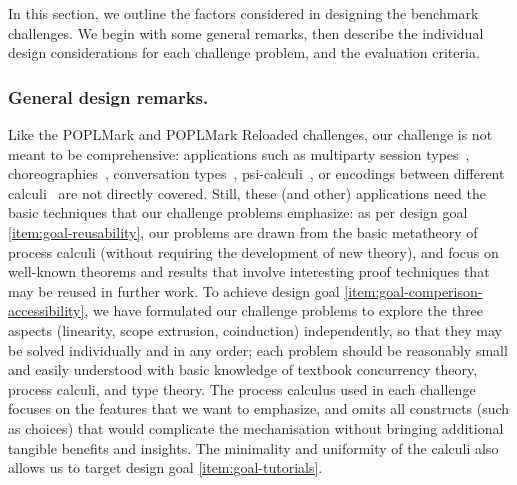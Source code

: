 \documentclass[runningheads]{llncs}
\begin{document}
In this section, we outline the factors considered in designing the
benchmark challenges. We begin with some general remarks, then
describe the individual design considerations for each challenge problem,
and the evaluation criteria.

\subsubsection{General design remarks.}
Like the POPLMark and POPLMark Reloaded challenges, our challenge is not meant to be comprehensive:
applications such as multiparty session types~\cite{10.1145/2827695,10.1145/3290343}, choreographies~\cite{DBLP:journals/jar/CruzFilipeMP23}, conversation types~\cite{DBLP:journals/tcs/CairesV10}, psi-calculi~\cite{lmcs:696}, or encodings between different calculi~\cite{DBLP:journals/iandc/Gorla10,DBLP:conf/forte/CairesP16,DBLP:journals/iandc/DardhaGS17,DBLP:conf/ecoop/ScalasDHY17,DBLP:journals/iandc/KouzapasPY19,10.1145/3479394.3479407} are not directly covered.  Still, these (and other) applications need the basic techniques that our challenge problems emphasize:
as per design goal \ref{item:goal-reusability},
our problems are drawn from the basic metatheory of process calculi (without requiring the development of new theory), and focus on well-known theorems
and results that involve interesting proof techniques that may be reused in further work.
To achieve design goal \ref{item:goal-comperison-accessibility},
we have formulated our challenge problems to explore the three aspects (linearity, scope extrusion, coinduction) independently, so that they may be solved individually and in any order;
each problem should be reasonably small and easily understood with basic knowledge of textbook concurrency theory, process calculi, and type theory.  The process calculus used in each challenge
focuses on the features that we want to emphasize, and omits all constructs
(such as choices) that would complicate the mechanisation without bringing additional tangible
benefits and insights. 
The minimality and uniformity of the calculi also allows us to target design
goal \ref{item:goal-tutorials}.

\end{document}
